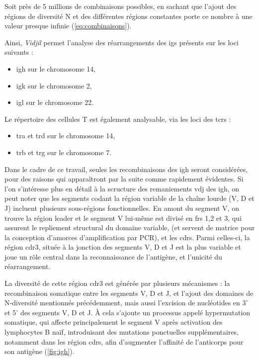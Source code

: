 Soit près de 5 millions de combinaisons possibles, en sachant que l'ajout des régions de diversité N
et des différentes régions constantes porte ce nombre à une valeur presque infinie (\autoref{eq:combinaisons}).

Ainsi, \textit{Vidjil} permet l'analyse des réarrangements des \glspl{ig} présents sur les loci suivants : 
\begin{itemize}
    \item \gls{igh} sur le chromosome 14, 
    \item \gls{igk} sur le chromosome 2, 
    \item \gls{igl} sur le chromosome 22.
\end{itemize}

Le répertoire des cellules T est également analysable, via les loci des \glspl{tcr} :
\begin{itemize}
    \item \gls{tra} et \gls{trd} sur le chromosome 14, 
    \item \gls{trb} et \gls{trg} sur le chromosome 7.
\end{itemize}

\vspace{1em}

Dans le cadre de ce travail, seules les recombinaisons des \gls{igh} seront considérées,
pour des raisons qui apparaîtront par la suite comme rapidement évidentes.
Si l'on s'intéresse plus en détail à la scructure des remaniements \gls{vdj} des \gls{igh},
on peut noter que les segments codant la région variable de la chaîne lourde (V, D et J)
incluent plusieurs sous-régions fonctionnelles. En amont du segment V, on trouve la région leader et 
le segment V lui-même est divisé en \glspl{fr} 1,2 et 3, qui assurent le repliement structural du domaine variable, 
(et servent de matrice pour la conception d'amorces d'amplification par PCR), 
et les \glspl{cdr}. Parmi celles-ci, la région \gls{cdr}3, située à la jonction des segments V, D et J 
est la plus variable et joue un rôle central dans la reconnaissance de l'antigène, et l'unicité du réarrangement.

\vspace{1em}

La diversité de cette région \gls{cdr}3 est générée par plusieurs mécanismes :
la recombinaison somatique entre les segments V, D et J, et l'ajout des domaines de N-diversité 
mentionnés précédemment, mais aussi l'excision de nucléotides en 3' et 5' des segments V, D et J.
À cela s'ajoute un processus appelé hypermutation somatique, qui affecte principalement le segment V 
après activation des lymphocytes B naïf, introduisant des mutations ponctuelles supplémentaires,
notamment dans les région \glspl{cdr}, afin d'augmenter l'affinité de l'anticorps pour son antigène (\autoref{fig:igh}).

